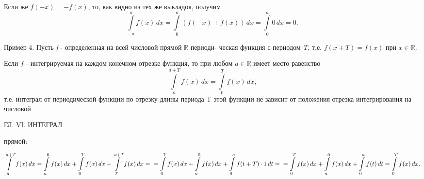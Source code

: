 \documentclass[a4paper, 10pt]{book}
\begin{document}
    
    \par
    Если же $f(-x) = -f(x)$, то, как видно из тех же выкладок, получим
    \[
    \int\limits_{-a}^{a} f(x) \,dx =
    \int\limits_{0}^{a} (f(-x) + f(x)) \,dx =
    \int\limits_{0}^{a} 0 \,dx = 0.
    \]


    \par
    Пример 4. Пусть \textit{f} - определенная на всей числовой прямой $\mathbb{R}$ периоди-
    ческая функция с периодом \textit{T}, т.е. $f(x+T)=f(x)$ при $x \in \mathbb{R}$.


    \par
    Если $f$—интегрируемая на каждом конечном отрезке функция, то при любом $a \in \mathbb{R}$ имеет место равенство
    \[
    \int\limits_{a}^{a+T} f(x) \,dx = \int\limits_{0}^{T} f(x) \,dx,
    \]
    т.е. интеграл от периодической функции по отрезку длины периода T этой функции не зависит от положения отрезка интегрирования на числовой

    \newpage
    \begin{center}
        ГЛ. VI. ИНТЕГРАЛ
    \end{center}

    \par\noindent
    прямой:

    
    $
    \displaystyle
    \int\limits_{a}^{a+T} f(x) \,dx = \int\limits_{a}^{0} f(x) \,dx + \int\limits_{0}^{T} f(x) \,dx + \int\limits_{T}^{a+T} f(x) \,dx = 
    \\
    \null\hfill =\int\limits_{0}^{T} f(x) \,dx + \int\limits_{a}^{0} f(x) \,dx + \int\limits_{0}^{a} f(t + T)\cdot1 \,dt=
    \\
    \null\hfill =\int\limits_{0}^{T} f(x) \,dx + \int\limits_{a}^{0} f(x) \,dx + \int\limits_{0}^{a} f(t) \,dt =\int\limits_{0}^{T} f(x) \,dx.
    $
\end{document}

